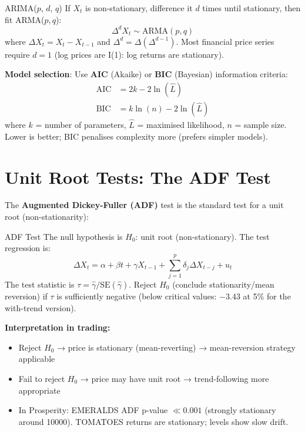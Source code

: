 \documentclass[12pt,a4paper,openany]{report}
\theoremstyle{definition}
\begin{document}
\begin{definitionbox}{ARIMA($p$, $d$, $q$)}
If $X_t$ is non-stationary, difference it $d$ times until stationary, then fit ARMA($p,q$):
\[
  \Delta^d X_t \sim \text{ARMA}(p,q)
\]
where $\Delta X_t = X_t - X_{t-1}$ and $\Delta^d = \Delta(\Delta^{d-1})$. Most financial price series require $d=1$ (log prices are I(1): log returns are stationary).
\end{definitionbox}

\textbf{Model selection}: Use \textbf{AIC} (Akaike) or \textbf{BIC} (Bayesian) information criteria:
\begin{align}
  \text{AIC} &= 2k - 2\ln(\hat{L}) \\
  \text{BIC} &= k\ln(n) - 2\ln(\hat{L})
\end{align}
where $k$ = number of parameters, $\hat{L}$ = maximised likelihood, $n$ = sample size. Lower is better; BIC penalises complexity more (prefers simpler models).

\section{Unit Root Tests: The ADF Test}

The \textbf{Augmented Dickey-Fuller (ADF)} test is the standard test for a unit root (non-stationarity):

\begin{definitionbox}{ADF Test}
The null hypothesis is $H_0$: unit root (non-stationary). The test regression is:
\[
  \Delta X_t = \alpha + \beta t + \gamma X_{t-1} + \sum_{j=1}^p \delta_j \Delta X_{t-j} + u_t
\]
The test statistic is $\tau = \hat{\gamma}/\text{SE}(\hat{\gamma})$. Reject $H_0$ (conclude stationarity/mean reversion) if $\tau$ is sufficiently negative (below critical values: $-3.43$ at 5\% for the with-trend version).
\end{definitionbox}

\textbf{Interpretation in trading:}
\begin{itemize}
  \item Reject $H_0$ → price is stationary (mean-reverting) → mean-reversion strategy applicable
  \item Fail to reject $H_0$ → price may have unit root → trend-following more appropriate
  \item In Prosperity: EMERALDS ADF p-value $\ll 0.001$ (strongly stationary around 10000). TOMATOES returns are stationary; levels show slow drift.
\end{itemize}
\end{document}
